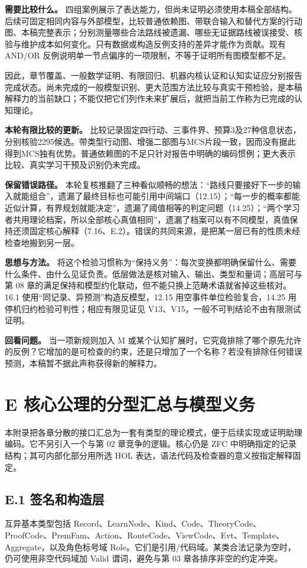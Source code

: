 \documentclass[UTF8,a4paper,zihao=-4,fontset=windows,openany]{ctexbook}
\newcommand{\mcsorigin}[1]{\par\noindent{\small\color{black!55}#1}\par\addvspace{0.8em}}
\begin{document}
\textbf{需要比较什么。} 四组案例展示了表达能力，但尚未证明必须使用本稿全部结构。后续可固定相同内容与外部模型，比较普通依赖图、带联合输入和替代方案的行动图、本稿完整表示；分别测量哪些合法路线被遗漏、哪些无证据路线被误接受、核验与维护成本如何变化。只有数据或构造反例支持的差异才能作为贡献。现有 AND/OR 反例说明单一节点偏序的一项限制，不等于证明所有图模型都不足。

因此，章节覆盖、一般数学证明、有限回归、机器内核认证和认知实证应分别报告完成状态。尚未完成的一般模型识别、更大范围方法比较与真实干预检验，是本稿解释力的当前缺口；不能仅把它们列作未来扩展后，就把当前工作称为已完成的认知理论。

\textbf{本轮有限比较的更新。} 比较记录固定四行动、三事件界、预算3及27种信息状态，分别核验2295候选。带类型行动图、增强二部图与MCS片段一致，因而没有据此得到MCS独有优势。普通依赖图的不足只针对报告中明确的编码惯例；更大表示比较、真实学习干预及识别仍未完成。

\textbf{保留错误路径。} 本轮复核推翻了三种看似顺畅的想法：“路线只要接好下一步的输入就能组合”，遗漏了最终目标也可能引用中间端口（12.15）；“每一步的概率都能近似计算，有界规划就能决定”，遗漏了阈值相等的判定问题（14.25）；“两个学习者共用理论档案，所以全部核心真值相同”，遗漏了档案可以有不同模型，真值保持还须固定核心解释（7.16、E.2）。错误的共同来源，是把某一层已有的性质未经检查地搬到另一层。

\textbf{思想与方法。} 将这个检验习惯称为“保持义务”：每次变换都明确保留什么、需要什么条件、由什么见证负责。低层做法是核对输入、输出、类型和量词；高层可与第 08 章的满足保持和模型约化联动，但不能只换上范畴术语就省掉这些核对。16.1 使用“同记录、异预测”构造反模型，12.15 用空事件单位检验复合，14.25 用停机归约检验可判性；相应有限见证见 V13、V15，一般不可判结论不由有限测试证明。

\textbf{回看问题。} 当一项新规则加入 M 或某个认知扩展时，它究竟排除了哪个原先允许的反例？它增加的是可检查的约束，还是只增加了一个名称？若没有排除任何错误预测，本稿暂不据此声称获得新的解释力。

\clearpage\chapter{E 核心公理的分型汇总与模型义务}
\label{mcs-source-23}
\mcsorigin{原章节：E-核心公理与验证条件.md}
本附录把各章分散的接口汇总为一套有类型的理论模式，便于后续实现或证明助理编码。它不另引入一个与第 02 章竞争的逻辑。核心仍是 ZFC 中明确指定的记录结构；其可内部化部分用所选 HOL 表达，语法代码及检查器的意义按指定解释固定。

\section{E.1 签名和构造层}
互异基本类型包括 Record、LearnNode、Kind、Code、TheoryCode、ProofCode、PremFam、Action、RouteCode、ViewCode、Evt、Template、Aggregate，以及角色标号域 Role。它们是引用/代码域。某类合法记录为空时，仍可使用非空代码域加 Valid 谓词，避免与第 03 章各排序非空的约定冲突。
\end{document}
